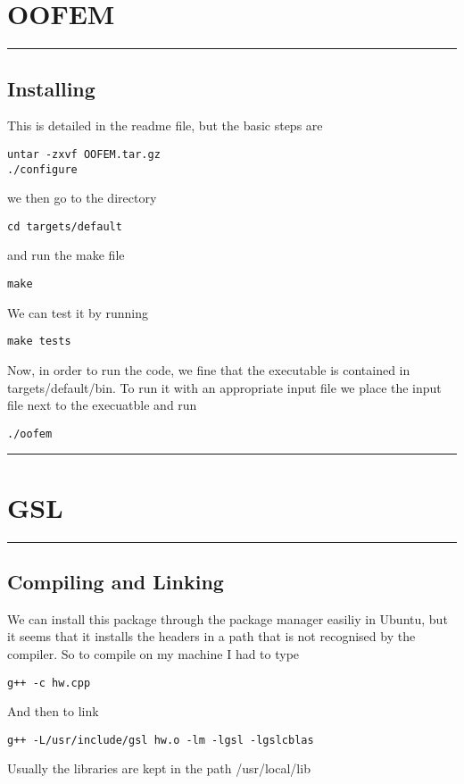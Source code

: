 \documentclass[a4paper, 10pt]{article}
\newcommand{\mytoprule}{\hrule\vspace{4mm}}
\newcommand{\mybotrule}{\vspace{4mm}\hrule}
\begin{document}
\vspace{10mm}
\section*{OOFEM}

\mytoprule
\subsection*{Installing}
This is detailed in the readme file, but the basic steps are 
\begin{Verbatim}
untar -zxvf OOFEM.tar.gz
./configure
\end{Verbatim}
we then go to the directory
\begin{Verbatim}
cd targets/default
\end{Verbatim}
and run the make file
\begin{Verbatim}
make
\end{Verbatim}
We can test it by running
\begin{Verbatim}
make tests
\end{Verbatim}

Now, in order to run the code, we fine that the executable is contained in targets/default/bin. To run it with an appropriate input file we place the input file next to the execuatble and run 
\begin{Verbatim}
./oofem
\end{Verbatim}
\mybotrule

\vspace{10mm}
\section*{GSL}

\mytoprule
\subsection*{Compiling and Linking}
We can install this package through the package manager easiliy in Ubuntu, but it seems that it installs the headers in a path that is not recognised by the compiler. So to compile on my machine I had to type
\begin{Verbatim}
g++ -c hw.cpp 
\end{Verbatim}
And then to link
\begin{Verbatim}
g++ -L/usr/include/gsl hw.o -lm -lgsl -lgslcblas
\end{Verbatim}
Usually the libraries are kept in the path /usr/local/lib
\end{document}
